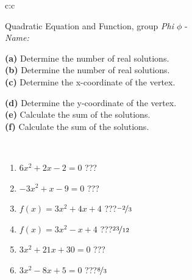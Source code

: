 \documentclass[10pt]{report}
\begin{document}
\begin{tabular}{c:c}
\begin{minipage}[c][104.5mm][t]{0.5\linewidth}
\begin{center}
\vspace{7mm}
{\huge {\LARGE Quadratic Equation and Function}, group \textit{Phi $\phi$} -}\\[5mm]
\textit{Name:}\phantom{xxxxxxxxxxxxxxxxxxxxxxxxxxxxxxxxxxxxxxxxxxxxxxxxxxxxxxxxxxxxxxxxx}\\[5mm]
\begin{minipage}{0.95\linewidth}
\begin{center}
{\small \begin{minipage}{0.5\textwidth}
\textbf{(a)} Determine the number of real solutions. \\[1mm]
\textbf{(b)} Determine the number of real solutions. \\[1mm]
\textbf{(c)} Determine the x-coordinate of the vertex.
\end{minipage} \begin{minipage}{0.49\textwidth}
\textbf{(d)} Determine the y-coordinate of the vertex. \\[1mm]
\textbf{(e)} Calculate the sum of the solutions. \\[1mm]
\textbf{(f)} Calculate the sum of the solutions.
\end{minipage}
}
\end{center}
\end{minipage}
\\[4mm]
\begin{minipage}{0.79\linewidth}
\begin{center}
\begin{varwidth}{\linewidth}
\begin{enumerate}
\Large
\item $6x^2+2x-2=0$\quad \dotfill\; ???\;\dotfill {}
\item $-3x^2+x-9=0$\quad \dotfill\; ???\;\dotfill {}
\item $f(x)=3x^2+4x+4$\quad \dotfill\; ???\;\dotfill \quad $\nicefrac{-2}{3}$
\item $f(x)=3x^2-x+4$\quad \dotfill\; ???\;\dotfill \quad $\nicefrac{23}{12}$
\item $3x^2+21x+30=0$\quad \dotfill\; ???\;\dotfill {}
\item $3x^2-8x+5=0$\quad \dotfill\; ???\;\dotfill \quad $\nicefrac{8}{3}$
\end{enumerate}
\end{varwidth}

\end{center}
\end{minipage}
\end{center}
\end{minipage}
\end{tabular}
\end{document}
